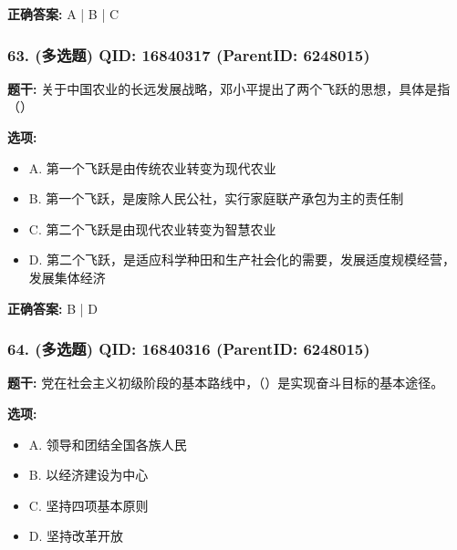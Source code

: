 \documentclass[12pt,UTF8]{ctexart}
\begin{document}
\textbf{正确答案:}
A | B | C

\vspace{0.3em}\hrulefill\vspace{0.7em}

\subsubsection*{63. (多选题) \small QID: 16840317 (ParentID: 6248015)}

\textbf{题干:}
关于中国农业的长远发展战略，邓小平提出了两个飞跃的思想，具体是指（）



\textbf{选项:}
\begin{itemize}[leftmargin=*]

  \item A. 第一个飞跃是由传统农业转变为现代农业

  \item B. 第一个飞跃，是废除人民公社，实行家庭联产承包为主的责任制

  \item C. 第二个飞跃是由现代农业转变为智慧农业

  \item D. 第二个飞跃，是适应科学种田和生产社会化的需要，发展适度规模经营，发展集体经济

\end{itemize}

\textbf{正确答案:}
B | D

\vspace{0.3em}\hrulefill\vspace{0.7em}

\subsubsection*{64. (多选题) \small QID: 16840316 (ParentID: 6248015)}

\textbf{题干:}
党在社会主义初级阶段的基本路线中，（）是实现奋斗目标的基本途径。



\textbf{选项:}
\begin{itemize}[leftmargin=*]

  \item A. 领导和团结全国各族人民

  \item B. 以经济建设为中心

  \item C. 坚持四项基本原则

  \item D. 坚持改革开放

\end{itemize}
\end{document}
